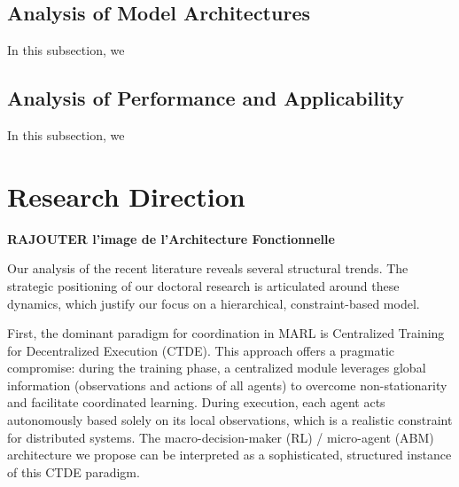 \documentclass[conference]{IEEEtran}
\begin{document}
\subsection{Analysis of Model Architectures}
In this subsection, we 

\subsection{Analysis of Performance and Applicability}
In this subsection, we 

\section{Research Direction}

\textbf{RAJOUTER l'image de l'Architecture Fonctionnelle}

Our analysis of the recent literature reveals several structural trends. The strategic positioning of our doctoral research is articulated around these dynamics, which justify our focus on a hierarchical, constraint-based model.

First, the dominant paradigm for coordination in MARL is Centralized Training for Decentralized Execution (CTDE). This approach offers a pragmatic compromise: during the training phase, a centralized module leverages global information (observations and actions of all agents) to overcome non-stationarity and facilitate coordinated learning. During execution, each agent acts autonomously based solely on its local observations, which is a realistic constraint for distributed systems. The macro-decision-maker (RL) / micro-agent (ABM) architecture we propose can be interpreted as a sophisticated, structured instance of this CTDE paradigm.
\end{document}
